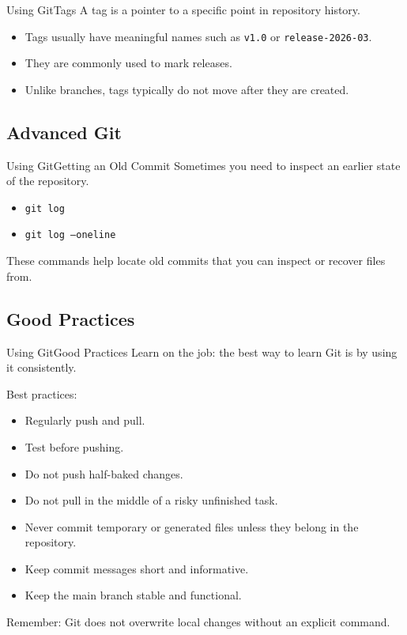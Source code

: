 \documentclass[10pt,compress]{beamer}
\begin{document}
\begin{frame}{Using Git}{Tags}
A tag is a pointer to a specific point in repository history.

\begin{itemize}
 \item Tags usually have meaningful names such as \texttt{v1.0} or \texttt{release-2026-03}.
 \item They are commonly used to mark releases.
 \item Unlike branches, tags typically do not move after they are created.
\end{itemize}
\end{frame}

\subsection{Advanced Git}

\begin{frame}{Using Git}{Getting an Old Commit}
Sometimes you need to inspect an earlier state of the repository.

\begin{itemize}
 \item \texttt{git log}
 \item \texttt{git log --oneline}
\end{itemize}

These commands help locate old commits that you can inspect or recover files from.
\end{frame}

\subsection{Good Practices}

\begin{frame}{Using Git}{Good Practices}
Learn on the job: the best way to learn Git is by using it consistently.

\bigskip

Best practices:
\begin{itemize}
 \item Regularly push and pull.
 \item Test before pushing.
 \item Do not push half-baked changes.
 \item Do not pull in the middle of a risky unfinished task.
 \item Never commit temporary or generated files unless they belong in the repository.
 \item Keep commit messages short and informative.
 \item Keep the main branch stable and functional.
\end{itemize}

Remember: Git does not overwrite local changes without an explicit command.
\end{frame}
\end{document}
